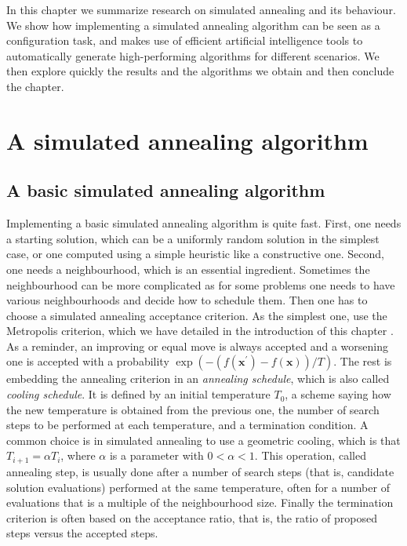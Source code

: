 In this chapter we summarize research on simulated annealing and its behaviour.
We show how implementing a simulated annealing algorithm can be seen as a configuration task,
and makes use of efficient artificial intelligence tools to automatically generate high-performing
algorithms for different scenarios. We then explore quickly the results and the algorithms we 
obtain and then conclude the chapter.



\section{A simulated annealing algorithm}

\subsection{A basic simulated annealing algorithm}


Implementing a basic simulated annealing algorithm is quite fast. First, one needs a starting 
solution, which can be a uniformly random solution in the simplest case, or one computed using a simple heuristic
like a constructive one. 
Second, one needs a neighbourhood, which is an essential ingredient. 
Sometimes the neighbourhood can be more complicated as 
for some problems one needs to have various neighbourhoods and decide how to schedule them. Then one has to choose a 
simulated annealing acceptance criterion. As the simplest one,
use the Metropolis criterion, which we have detailed in the introduction of this chapter
 \cite{MetRosRosTel53,JohAraMcGSch1989,JohAraMcGSch1991}. As a reminder, an 
improving or equal move is always accepted and a worsening one is accepted with a probability 
$\exp{(-(f(\mathbf{x^\prime}) - f(\mathbf{x}))/T)}$. The rest is embedding the annealing criterion in an 
\textit{annealing schedule}, which is also called \textit{cooling schedule}. 
It is defined by an initial temperature $T_0$, a scheme saying how the new temperature is
obtained from the previous one, the number of search steps to be performed at
each temperature, and a termination condition. A common choice is in simulated annealing to use
a geometric cooling, which is that  $T_{i+1} = \alpha T_i$, where $\alpha$ is a parameter 
with $0 < \alpha < 1$. This operation, called annealing step, is usually done 
after a number of search steps (that is, candidate solution evaluations) performed at 
the same temperature, often for a number of evaluations that is a multiple of the neighbourhood size. 
Finally the termination criterion is often based on the acceptance ratio, that is, 
the ratio of proposed steps versus the accepted steps. 

